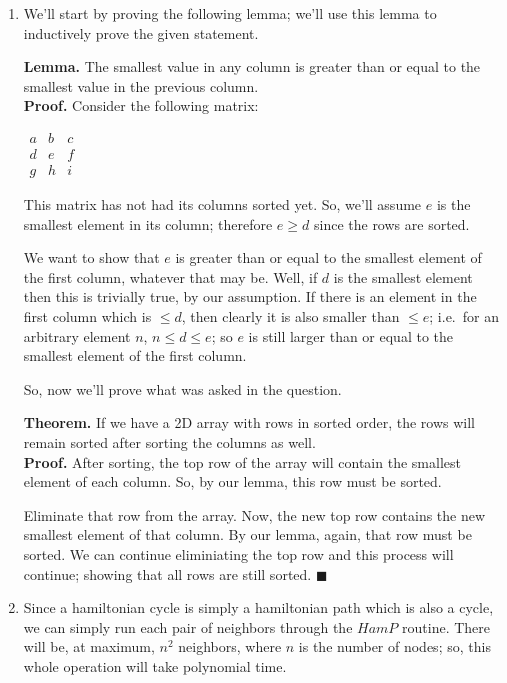 \documentclass[12pt]{article}
\begin{document}
\begin{enumerate}
\item 

  We'll start by proving the following lemma; we'll use this lemma to
  inductively prove the given statement.

  \textbf{Lemma.} The smallest value in any column is greater than or equal to
  the smallest value in the previous column.\\
  \textbf{Proof.} Consider the following matrix:

  $\begin{matrix}
    a & b & c \\
    d & e & f \\
    g & h & i
  \end{matrix}$

  This matrix has not had its columns sorted yet. So, we'll assume $e$ is the
  smallest element in its column; therefore $e \ge d$ since the rows are sorted.

  We want to show that $e$ is greater than or equal to the smallest element of the first
  column, whatever that may be. Well, if $d$ is the smallest element then this
  is trivially true, by our assumption. If there is an element in the first
  column which is $\le d$, then clearly it is also smaller than $\le e$;
  i.e.\ for an arbitrary element $n$, $n \le d \le e$; so $e$ is still larger 
  than or equal to the smallest element of the first column.

  So, now we'll prove what was asked in the question.

  \textbf{Theorem.} If we have a 2D array with rows in sorted order, the rows
  will remain sorted after sorting the columns as well. \\
  \textbf{Proof.} After sorting, the top row of the array will contain the
  smallest element of each column. So, by our lemma, this row must be sorted.

  Eliminate that row from the array. Now, the new top row contains the new
  smallest element of that column. By our lemma, again, that row must be
  sorted. We can continue eliminiating the top row and this process will
  continue; showing that all rows are still sorted. $\blacksquare$

\item

  Since a hamiltonian cycle is simply a hamiltonian path which is also a
  cycle, we can simply run each pair of neighbors through the $HamP$ routine.
  There will be, at maximum, $n^2$ neighbors, where $n$ is the number of nodes;
  so, this whole operation will take polynomial time.


\end{enumerate}
\end{document}
